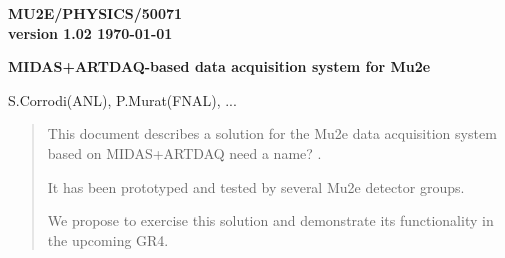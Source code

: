 \documentclass[12pt]{article}
\begin{document}
\begin{titlepage}
  \begin{flushright}
    \bf {MU2E/PHYSICS/50071} \\
    version 1.02
    \today
 \end{flushright}

  \vspace{1cm}

  \begin{center}
    {\Large \bf MIDAS+ARTDAQ-based data acquisition system for Mu2e
      \vspace{0.3in}
    }

    \vspace{1cm}
    S.Corrodi(ANL), P.Murat(FNAL), ...

    \vspace{0.3cm}

    \vspace{0.8cm}
  \end{center}

  \begin{abstract}
    \vspace{0.2in}

    This document describes a solution for the Mu2e data acquisition
    system based on MIDAS+ARTDAQ {\red need a name? }.

    It has been prototyped and tested by several Mu2e
    detector groups. 

    We propose to exercise this solution and demonstrate
    its functionality in the upcoming GR4.
  \end{abstract}

\end{titlepage}
%
%
%
{\tableofcontents}

% 

\newpage
\end{document}
